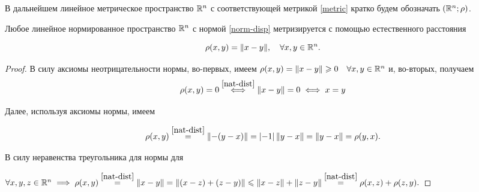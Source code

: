\documentclass[../../main.tex]{subfiles}
\begin{document}
В дальнейшем линейное метрическое пространство $\mathbb{R}^n$ с 
соответствующей метрикой \eqref{metric} кратко будем обозначать
$\left(\mathbb{R}^n; \rho\right)$.

\begin{thm}
 Любое линейное нормированное пространство $\mathbb{R}^n$ с нормой
 \eqref{norm-disp} метризируется с помощью естественного расстояния

 \begin{equation}
  \label{nat-dist}
  \rho(x, y) = \lVert{x-y}\rVert,\quad \forall x, y \in \mathbb{R}^n.
 \end{equation}
 
\end{thm}

\begin{proof}
 В силу аксиомы неотрицательности нормы, во-первых, имеем $\rho(x, y) 
 = \lVert{x-y}\rVert \geqslant 0 \quad \forall x, y \in \mathbb{R}^n$ и, во-вторых, получаем
 \[\rho(x, y) = 0 \stackrel{\eqref{nat-dist}}{\iff} \lVert{x-y}\rVert = 0 
  \iff x = y\]
 
 Далее, используя аксиомы нормы, имеем
 
 \[\rho(x, y) \stackrel{\eqref{nat-dist}}{=} \lVert{-(y-x)}\rVert =
   \left|{-1}\right|\lVert{y-x}\rVert = \lVert{y-x}\rVert = \rho(y, x).\]
 
 В силу неравенства треугольника для нормы для
 
 $\forall x, y, z \in \R^n \implies \rho(x, y) \stk{nat-dist}{=} 
  \norm{x-y} = \norm{(x-z) + (z-y)} \le
  \norm{x-z} + \norm{z-y} \stk{nat-dist}{=} \rho(x, z) +  \rho(z, y).$
\end{proof}
\end{document}
